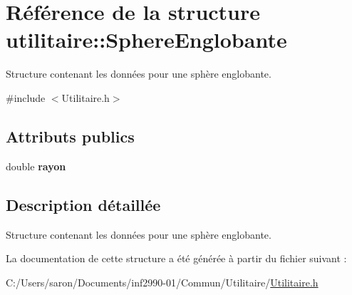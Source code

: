 \hypertarget{structutilitaire_1_1_sphere_englobante}{\section{Référence de la structure utilitaire\-:\-:Sphere\-Englobante}
\label{structutilitaire_1_1_sphere_englobante}
}


Structure contenant les données pour une sphère englobante.  




{\ttfamily \#include $<$Utilitaire.\-h$>$}

\subsection*{Attributs publics}
\begin{DoxyCompactItemize}
\item 
\hypertarget{structutilitaire_1_1_sphere_englobante_aa340be7e333276aaa7bb2dc18ad33100}{double {\bfseries rayon}}\label{structutilitaire_1_1_sphere_englobante_aa340be7e333276aaa7bb2dc18ad33100}

\end{DoxyCompactItemize}


\subsection{Description détaillée}
Structure contenant les données pour une sphère englobante. 

La documentation de cette structure a été générée à partir du fichier suivant \-:\begin{DoxyCompactItemize}
\item 
C\-:/\-Users/saron/\-Documents/inf2990-\/01/\-Commun/\-Utilitaire/\hyperlink{_utilitaire_8h}{Utilitaire.\-h}\end{DoxyCompactItemize}

